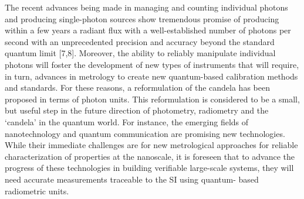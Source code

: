

			The recent advances being made in managing and counting individual photons and producing single-photon sources show tremendous promise of producing within a few years a radiant flux with a well-established number of photons per second with an unprecedented precision and accuracy beyond the standard quantum limit [7,8]. Moreover, the ability to reliably manipulate individual photons will foster the development of new types of instruments that will require, in turn, advances in metrology to create new quantum-based calibration methods and standards. For these reasons, a reformulation of the candela has been proposed in terms of photon units. This reformulation is considered to be a small, but useful step in the future direction of photometry, radiometry and the ‘candela’ in the quantum world. For instance, the emerging fields of nanotechnology and quantum communication are promising new technologies. While their immediate challenges are for new metrological approaches for reliable characterization of properties at the nanoscale, it is foreseen that to advance the progress of these technologies in building verifiable large-scale systems, they will need accurate measurements traceable to the SI using quantum- based radiometric units.

